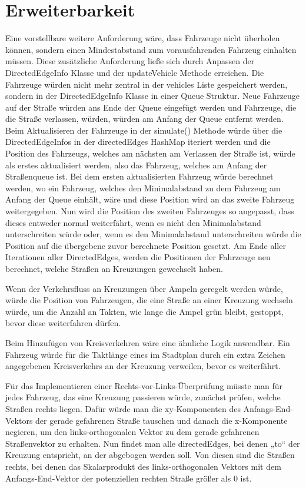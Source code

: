 \chapter{Erweiterbarkeit}
Eine vorstellbare weitere Anforderung wäre, 
dass Fahrzeuge nicht überholen können, sondern einen Mindestabstand zum vorausfahrenden Fahrzeug einhalten müssen.
Diese zusätzliche Anforderung ließe sich durch Anpassen der DirectedEdgeInfo Klasse und der updateVehicle Methode erreichen.
Die Fahrzeuge würden nicht mehr zentral in der vehicles Liste gespeichert werden, sondern in der DirectedEdgeInfo Klasse in einer
Queue Struktur. Neue Fahrzeuge auf der Straße würden ans Ende der Queue eingefügt werden und Fahrzeuge, die die Straße verlassen, 
würden, würden am Anfang der Queue entfernt werden.
Beim Aktualisieren der Fahrzeuge in der simulate() Methode würde über die DirectedEdgeInfos in der directedEdges HashMap iteriert werden
und die Position des Fahrzeugs, welches am nächsten am Verlassen der Straße ist, würde als erstes aktualisiert werden, also das Fahrzeug, welches am Anfang der 
Straßenqueue ist. Bei dem ersten aktualisierten Fahrzeug würde berechnet werden, wo ein Fahrzeug, welches den Minimalabstand zu dem Fahrzeug am Anfang der Queue einhält, wäre und diese Position wird an
das zweite Fahrzeug weitergegeben. Nun wird die Position des zweiten Fahrzeuges so angepasst, dass dieses entweder normal weiterfährt, wenn es nicht den Minimalabstand unterschreiten würde oder,
wenn es den Minimalabstand unterschreiten würde die Position auf die übergebene zuvor berechnete Position gesetzt.
Am Ende aller Iterationen aller DirectedEdges, werden die Positionen der Fahrzeuge neu berechnet, welche Straßen an Kreuzungen gewechselt haben.

Wenn der Verkehrsfluss an Kreuzungen über Ampeln geregelt werden würde, würde die Position von Fahrzeugen,
die eine Straße an einer Kreuzung wechseln würde, um die Anzahl an Takten, wie lange die Ampel grün bleibt, gestoppt, bevor diese weiterfahren dürfen.

Beim Hinzufügen von Kreisverkehren wäre eine ähnliche Logik anwendbar. Ein Fahrzeug würde für die Taktlänge eines im Stadtplan durch ein extra Zeichen angegebenen Kreisverkehrs
an der Kreuzung verweilen, bevor es weiterfährt.

Für das Implementieren einer Rechts-vor-Links-Überprüfung müsste man für jedes Fahrzeug, das eine Kreuzung passieren würde, zunächst prüfen,
welche Straßen rechts liegen. Dafür würde man die xy-Komponenten des Anfangs-End-Vektors der gerade gefahrenen Straße tauschen und danach die x-Komponente negieren,
um den links-orthogonalen Vektor zu dem gerade gefahrenen Straßenvektor zu erhalten. Nun findet man alle directedEdges, bei denen „to“ der Kreuzung entspricht, an der abgebogen werden soll.
Von diesen sind die Straßen rechts, bei denen das Skalarprodukt des links-orthogonalen Vektors mit dem Anfangs-End-Vektor der potenziellen rechten Straße größer als 0 ist.

